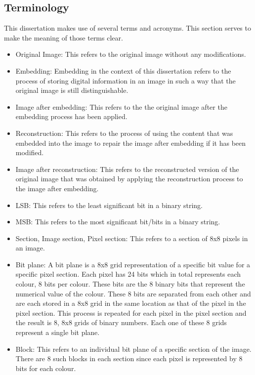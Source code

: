 \documentclass[12pt]{article}
\begin{document}
\subsection{Terminology}
This dissertation makes use of several terms and acronyms.
This section serves to make the meaning of those terms clear.

\begin{itemize}
  \item Original Image: This refers to the original image without any modifications.
  \item Embedding: Embedding in the context of this dissertation refers to the process of storing digital information in an image in such a way that the original image is still distinguishable.
  \item Image after embedding: This refers to the the original image after the embedding process has been applied.
  \item Reconstruction: This refers to the process of using the content that was embedded into the image to repair the image after embedding if it has been modified.
  \item Image after reconstruction: This refers to the reconstructed version of the original image that was obtained by applying the reconstruction process to the image after embedding.
  \item LSB: This refers to the least significant bit in a binary string.
  \item MSB: This refers to the most significant bit/bits in a binary string.
  \item Section, Image section, Pixel section: This refers to a section of 8x8 pixels in an image.
  \item Bit plane: A bit plane is a 8x8 grid representation of a specific bit value for a specific pixel section. Each pixel has 24 bits which in total represents each colour, 8 bits per colour. These bits are the 8 binary bits that represent the numerical value of the colour. These 8 bits are separated from each other and are each stored in a 8x8 grid in the same location as that of the pixel in the pixel section. This process is repeated for each pixel in the pixel section and the result is 8, 8x8 grids of binary numbers. Each one of these 8 grids represent a single bit plane. 
  \item Block: This refers to an individual bit plane of a specific section of the image. There are 8 such blocks in each section since each pixel is represented by 8 bits for each colour.
\end{itemize}
\end{document}
